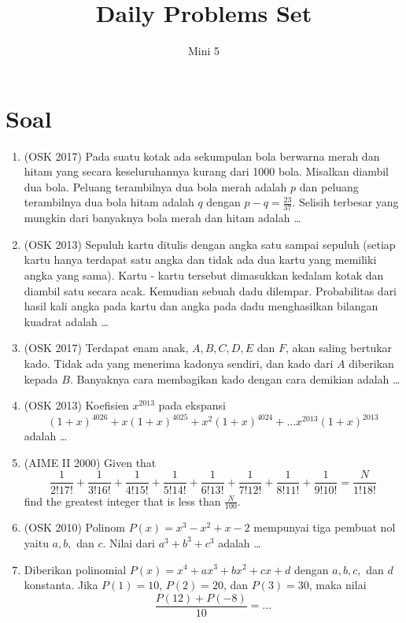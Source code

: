 \documentclass[12pt]{scrartcl}
\begin{document}
    \title{Daily Problems Set} %
    \date{}
    \author{Mini 5}
    \maketitle

\renewcommand*\contentsname{Daftar Isi}
\tableofcontents

\newpage
    
    \section{Soal}
    \begin{enumerate}
        \item (OSK 2017) Pada suatu kotak ada sekumpulan bola berwarna merah dan hitam yang secara keseluruhannya kurang dari 1000 bola. Misalkan diambil dua bola. Peluang terambilnya dua bola merah adalah $p$ dan peluang terambilnya dua bola hitam adalah $q$ dengan $p-q =\frac{23}{37}$. Selisih terbesar yang mungkin dari banyaknya bola merah dan hitam adalah \dots

        \item (OSK 2013) Sepuluh kartu ditulis dengan angka satu sampai sepuluh (setiap kartu hanya terdapat satu angka dan tidak ada dua kartu yang memiliki angka yang sama). Kartu - kartu tersebut dimasukkan kedalam kotak dan diambil satu secara acak. Kemudian sebuah dadu dilempar. Probabilitas dari hasil kali angka pada kartu dan angka pada dadu menghasilkan bilangan kuadrat adalah \dots

        \item (OSK 2017) Terdapat enam anak, $A, B, C, D, E$ dan $F$, akan saling bertukar kado. Tidak ada yang menerima kadonya sendiri, dan kado dari $A$ diberikan kepada $B$. Banyaknya cara membagikan kado dengan cara demikian adalah \dots

        \item (OSK 2013) Koefisien $x^{2013}$ pada ekspansi
        $$(1+x)^{4026}+x(1+x)^{4025}+x^2(1+x)^{4024}+\dots x^{2013}(1+x)^{2013}$$
        adalah \dots

        \item (AIME II 2000) Given that 
        $$\frac 1{2!17!}+\frac 1{3!16!}+\frac 1{4!15!}+\frac 1{5!14!}+\frac 1{6!13!}+\frac 1{7!12!}+\frac 1{8!11!}+\frac 1{9!10!}=\frac N{1!18!}$$
        find the greatest integer that is less than $\frac N{100}$.

        \item (OSK 2010) Polinom $P(x)=x^3-x^2+x-2$ mempunyai tiga pembuat nol yaitu $a,b,$ dan $c$. Nilai dari $a^3+b^3+c^3$ adalah \dots
        
        \item Diberikan polinomial $P(x)=x^4+ax^3+bx^2+cx+d$ dengan $a,b,c,$ dan $d$ konstanta. Jika $P(1)=10$, $P(2)=20$, dan  $P(3)=30$, maka nilai
        $$\dfrac{P(12)+P(-8)}{10}=\dots$$
    \end{enumerate}
\end{document}
